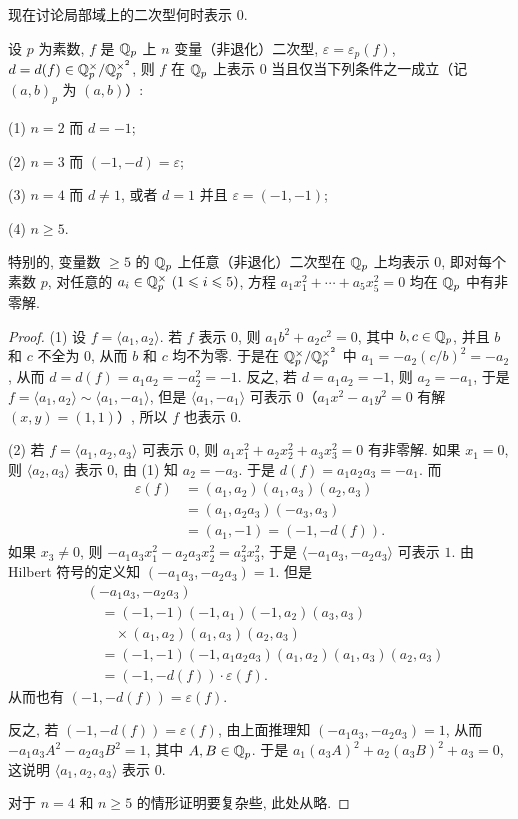 现在讨论局部域上的二次型何时表示 $0$.

\begin{theorem}\label{thm:9.15}
设 $p$ 为素数, $f$ 是 $\mathbb{Q}_p$ 上 $n$ 变量（非退化）二次型, $\varepsilon=\varepsilon_p(f)$, $d=d(f)\in\mathbb{Q}_p^{\times}/\mathbb{Q}_p^{\times^2}$, 则 $f$ 在 $\mathbb{Q}_p$ 上表示 $0$ 当且仅当下列条件之一成立（记 $(a,b)_p$ 为 $(a,b)$）:

(1) $n=2$ 而 $d=-1$;

(2) $n=3$ 而 $(-1,-d)=\varepsilon$;

(3) $n=4$ 而 $d\neq 1$, 或者 $d=1$ 并且 $\varepsilon=(-1,-1)$;

(4) $n\geqslant 5$.

特别的, 变量数 $\geqslant 5$ 的 $\mathbb{Q}_p$ 上任意（非退化）二次型在 $\mathbb{Q}_p$ 上均表示 $0$, 即对每个素数 $p$, 对任意的 $a_i\in\mathbb{Q}_p^{\times}\ (1\leqslant i\leqslant 5)$, 方程 $a_1x_1^2+\cdots+a_5x_5^2=0$ 均在 $\mathbb{Q}_p$ 中有非零解.
\end{theorem}

\begin{proof}
(1) 设 $f=\langle a_1,a_2\rangle$. 若 $f$ 表示 $0$, 则 $a_1b^2+a_2c^2=0$, 其中 $b,c\in\mathbb{Q}_p$, 并且 $b$ 和 $c$ 不全为 $0$, 从而 $b$ 和 $c$ 均不为零. 于是在 $\mathbb{Q}_p^{\times}/\mathbb{Q}_p^{\times^2}$ 中 $a_1=-a_2(c/b)^2=-a_2$, 从而 $d=d(f)=a_1a_2=-a_2^2=-1$. 反之, 若 $d=a_1a_2=-1$, 则 $a_2=-a_1$, 于是 $f=\langle a_1,a_2\rangle\sim\langle a_1,-a_1\rangle$, 但是 $\langle a_1,-a_1\rangle$ 可表示 $0$（$a_1x^2-a_1y^2=0$ 有解 $(x,y)=(1,1)$）, 所以 $f$ 也表示 $0$.

(2) 若 $f=\langle a_1,a_2,a_3\rangle$ 可表示 $0$, 则 $a_1x_1^2+a_2x_2^2+a_3x_3^2=0$ 有非零解. 如果 $x_1=0$, 则 $\langle a_2,a_3\rangle$ 表示 $0$, 由 (1) 知 $a_2=-a_3$. 于是 $d(f)=a_1a_2a_3=-a_1$. 而
\[
  \begin{aligned}
    \varepsilon(f)&=(a_1,a_2)(a_1,a_3)(a_2,a_3)\\
    &=(a_1,a_2a_3)(-a_3,a_3)\\
    &=(a_1,-1)=(-1,-d(f)).
  \end{aligned}
\]
如果 $x_3\neq 0$, 则 $-a_1a_3x_1^2-a_2a_3x_2^2=a_3^2x_3^2$, 于是 $\langle -a_1a_3,-a_2a_3\rangle$ 可表示 $1$. 由 Hilbert 符号的定义知 $(-a_1a_3,-a_2a_3)=1$. 但是
\[
  \begin{aligned}
    &(-a_1a_3,-a_2a_3)\\
    &\quad=(-1,-1)(-1,a_1)(-1,a_2)(a_3,a_3)\\
    &\qquad\times(a_1,a_2)(a_1,a_3)(a_2,a_3)\\
    &\quad=(-1,-1)(-1,a_1a_2a_3)(a_1,a_2)(a_1,a_3)(a_2,a_3)\\
    &\quad=(-1,-d(f))\cdot\varepsilon(f).
  \end{aligned}
\]
从而也有 $(-1,-d(f))=\varepsilon(f)$.

反之, 若 $(-1,-d(f))=\varepsilon(f)$, 由上面推理知 $(-a_1a_3,-a_2a_3)=1$, 从而 $-a_1a_3A^2-a_2a_3B^2=1$, 其中 $A,B\in\mathbb{Q}_p$. 于是 $a_1(a_3A)^2+a_2(a_3B)^2+a_3=0$, 这说明 $\langle a_1,a_2,a_3\rangle$ 表示 $0$.

对于 $n=4$ 和 $n\geqslant 5$ 的情形证明要复杂些, 此处从略.
\end{proof}

